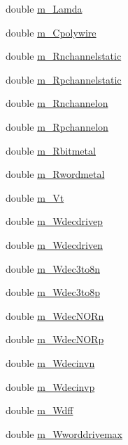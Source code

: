\begin{DoxyCompactItemize}
\item 
double \hyperlink{classTechParameter_a087851c45de6ead301babc5bc897046f}{m\_\-Lamda}
\item 
double \hyperlink{classTechParameter_a6017c26381a3f32f7f49a197396bc688}{m\_\-Cpolywire}
\item 
double \hyperlink{classTechParameter_ac6fb0395796d4ead6e86940fd8ad3411}{m\_\-Rnchannelstatic}
\item 
double \hyperlink{classTechParameter_a96ccc88726a60353cbd9b88a10f37fb1}{m\_\-Rpchannelstatic}
\item 
double \hyperlink{classTechParameter_acdca1c9b1ffcd8d3c368f41ca072a492}{m\_\-Rnchannelon}
\item 
double \hyperlink{classTechParameter_abfa92718267f22a38ad9db7d00474c76}{m\_\-Rpchannelon}
\item 
double \hyperlink{classTechParameter_a7f5032be3b9e33aeee877e121f383f16}{m\_\-Rbitmetal}
\item 
double \hyperlink{classTechParameter_adefb9c5ec55dc21ca90149fad39623e9}{m\_\-Rwordmetal}
\item 
double \hyperlink{classTechParameter_afbe641f17ab4193e52e91c5c1a071b69}{m\_\-Vt}
\item 
double \hyperlink{classTechParameter_af2043a3a3a70e476bb63d48c7afd9dcf}{m\_\-Wdecdrivep}
\item 
double \hyperlink{classTechParameter_a56baeb770076c82b9d140b1f4074634a}{m\_\-Wdecdriven}
\item 
double \hyperlink{classTechParameter_af288251a355dc841c4b4ea8c3bb60246}{m\_\-Wdec3to8n}
\item 
double \hyperlink{classTechParameter_ad266f32fa6e81cafec45f920f40bf9a4}{m\_\-Wdec3to8p}
\item 
double \hyperlink{classTechParameter_a3ae79b54ab699095f1ac16e7be678a1a}{m\_\-WdecNORn}
\item 
double \hyperlink{classTechParameter_af5a97fbad8b894e3b0df3205b8365465}{m\_\-WdecNORp}
\item 
double \hyperlink{classTechParameter_a75b43248267119505f4f4e9ef3b50327}{m\_\-Wdecinvn}
\item 
double \hyperlink{classTechParameter_ae86ec8f8199226e71cafd598e1326ed4}{m\_\-Wdecinvp}
\item 
double \hyperlink{classTechParameter_a6a28cee7c0a7f6d3c254f5a6fe7b472a}{m\_\-Wdff}
\item 
double \hyperlink{classTechParameter_a8ce9b55dd810721e13d7250d2e8ba486}{m\_\-Wworddrivemax}
\item 

\end{DoxyCompactItemize}
